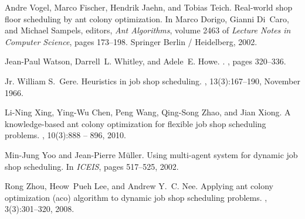 \documentclass[review]{elsarticle}
\begin{document}
\begin{thebibliography}{10}
Andre Vogel, Marco Fischer, Hendrik Jaehn, and Tobias Teich.
\newblock Real-world shop floor scheduling by ant colony optimization.
\newblock In Marco Dorigo, Gianni Di~Caro, and Michael Sampels, editors, {\em
  Ant Algorithms}, volume 2463 of {\em Lecture Notes in Computer Science},
  pages 173--198. Springer Berlin / Heidelberg, 2002.

Jean-Paul Watson, Darrell~L. Whitley, and Adele~E. Howe.
.
, pages 320--336.

Jr. William S.~Gere.
\newblock Heuristics in job shop scheduling.
, 13(3):167--190, November 1966.

Li-Ning Xing, Ying-Wu Chen, Peng Wang, Qing-Song Zhao, and Jian Xiong.
\newblock A knowledge-based ant colony optimization for flexible job shop
  scheduling problems.
, 10(3):888 -- 896, 2010.

Min-Jung Yoo and Jean-Pierre M{\"u}ller.
\newblock Using multi-agent system for dynamic job shop scheduling.
\newblock In {\em ICEIS}, pages 517--525, 2002.

Rong Zhou, Heow~Pueh Lee, and Andrew Y.~C. Nee.
\newblock Applying ant colony optimization (aco) algorithm to dynamic job shop
  scheduling problems.
, 3(3):301--320,
  2008.

\end{thebibliography}
\end{document}
